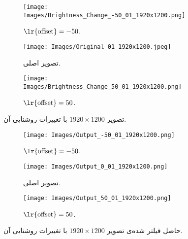 \documentclass[12pt,onecolumn,a4paper]{article}
\begin{document}
\begin{figure}
     \centering
     \begin{subfigure}[b]{0.3\textwidth}
         \centering
         \texttt{[image: Images/Brightness\_Change\_-50\_01\_1920x1200.png]}
         \caption{$\text{\lr{offset}}=-50$.}
         \label{Figure:01_1920x1200_-50}
     \end{subfigure}
     \hfill
     \begin{subfigure}[b]{0.3\textwidth}
         \centering
         \texttt{[image: Images/Original\_01\_1920x1200.jpeg]}
         \caption{تصویر اصلی.}
         \label{Figure:01_1920x1200_0}
     \end{subfigure}
     \hfill
     \begin{subfigure}[b]{0.3\textwidth}
         \centering
         \texttt{[image: Images/Brightness\_Change\_50\_01\_1920x1200.png]}
         \caption{$\text{\lr{offset}}=50$.}
         \label{Figure:01_1920x1200_50}
     \end{subfigure}
\caption{تصویر $1920 \times 1200$ با تغییرات روشنایی آن.}
\label{Figure:01_1920x1200}
\end{figure}

\begin{figure}
     \centering
     \begin{subfigure}[b]{0.3\textwidth}
         \centering
         \texttt{[image: Images/Output\_-50\_01\_1920x1200.png]}
         \caption{$\text{\lr{offset}}=-50$.}
         \label{Figure:Output_01_1920x1200_-50}
     \end{subfigure}
     \hfill
     \begin{subfigure}[b]{0.3\textwidth}
         \centering
         \texttt{[image: Images/Output\_0\_01\_1920x1200.png]}
         \caption{تصویر اصلی.}
         \label{Figure:Output_01_1920x1200_0}
     \end{subfigure}
     \hfill
     \begin{subfigure}[b]{0.3\textwidth}
         \centering
         \texttt{[image: Images/Output\_50\_01\_1920x1200.png]}
         \caption{$\text{\lr{offset}}=50$.}
         \label{Figure:Output_01_1920x1200_50}
     \end{subfigure}
\caption{حاصل فیلتر شده‌ی تصویر $1920 \times 1200$ با تغییرات روشنایی آن.}
\label{Figure:Output_01_1920x1200}
\end{figure}
\end{document}

